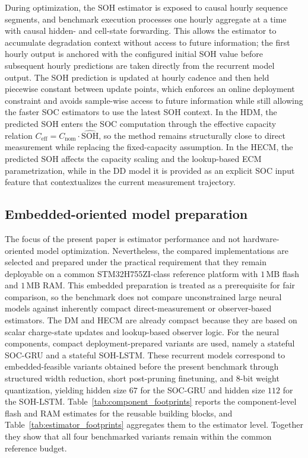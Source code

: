 \documentclass[review]{elsarticle}
\begin{document}
During optimization, the SOH estimator is exposed to causal hourly sequence segments, and benchmark execution processes one hourly aggregate at a time with causal hidden- and cell-state forwarding. This allows the estimator to accumulate degradation context without access to future information; the first hourly output is anchored with the configured initial SOH value before subsequent hourly predictions are taken directly from the recurrent model output. The SOH prediction is updated at hourly cadence and then held piecewise constant between update points, which enforces an online deployment constraint and avoids sample-wise access to future information while still allowing the faster SOC estimators to use the latest SOH context. In the HDM, the predicted SOH enters the SOC computation through the effective capacity relation $C_{\mathrm{eff}} = C_{\mathrm{nom}} \cdot \widehat{\mathrm{SOH}}$, so the method remains structurally close to direct measurement while replacing the fixed-capacity assumption. In the HECM, the predicted SOH affects the capacity scaling and the lookup-based ECM parametrization, while in the DD model it is provided as an explicit SOC input feature that contextualizes the current measurement trajectory.

\subsection{Embedded-oriented model preparation}
The focus of the present paper is estimator performance and not hardware-oriented model optimization. Nevertheless, the compared implementations are selected and prepared under the practical requirement that they remain deployable on a common STM32H755ZI-class reference platform with $1\,\mathrm{MB}$ flash and $1\,\mathrm{MB}$ RAM. This embedded preparation is treated as a prerequisite for fair comparison, so the benchmark does not compare unconstrained large neural models against inherently compact direct-measurement or observer-based estimators. The DM and HECM are already compact because they are based on scalar charge-state updates and lookup-based observer logic. For the neural components, compact deployment-prepared variants are used, namely a stateful SOC-GRU and a stateful SOH-LSTM. These recurrent models correspond to embedded-feasible variants obtained before the present benchmark through structured width reduction, short post-pruning finetuning, and $8$-bit weight quantization, yielding hidden size $67$ for the SOC-GRU and hidden size $112$ for the SOH-LSTM. Table~\ref{tab:component_footprints} reports the component-level flash and RAM estimates for the reusable building blocks, and Table~\ref{tab:estimator_footprints} aggregates them to the estimator level. Together they show that all four benchmarked variants remain within the common reference budget.
\end{document}
